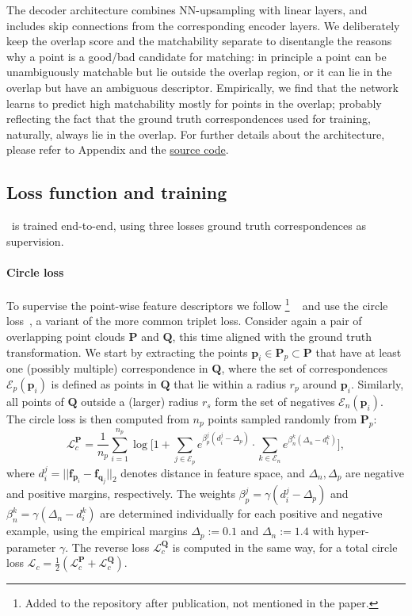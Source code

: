 The decoder architecture combines {NN}-upsampling with linear layers, and includes skip connections from the corresponding encoder layers.
We deliberately keep the overlap score and the matchability separate
to disentangle the reasons why a point is a good/bad candidate for matching: in principle a point can be unambiguously matchable but lie outside the overlap region, or it can lie in the overlap but have an ambiguous descriptor.
Empirically, we find that the network learns to predict high matchability mostly for points in the overlap; probably reflecting the fact that the ground truth correspondences used for training, naturally, always lie in the overlap.
For further details about the architecture, please refer to Appendix and the \href{https://github.com/ShengyuH/OverlapPredator}{source code}.

\subsection{Loss function and training}
\label{sec:method_training}
\acro\ is trained end-to-end, using three losses \wrt ground truth correspondences as supervision.

\paragraph{Circle loss}
To supervise the point-wise feature descriptors we follow%
\footnote{Added to the repository after publication, not mentioned in the paper.}%
~\cite{bai2020d3feat} and use the circle loss~\cite{sun2020circle}, a variant of the more common triplet loss.
Consider again a pair of overlapping point clouds $\mathbf{P}$ and $\mathbf{Q}$, this time aligned with the ground truth transformation. We start by extracting the points $\mathbf{p}_i\!\in\!\mathbf{P}_p\!\subset\!\mathbf{P}$ that have at least one (possibly multiple) correspondence in $\mathbf{Q}$,
where the set of correspondences $\mathcal{E}_p(\mathbf{p}_i)$  is defined as points in $\mathbf{Q}$ that lie within a radius $r_p$ around $\mathbf{p}_i$. Similarly, all points of $\mathbf{Q}$  outside a (larger) radius
$r_s$ form the set of negatives $\mathcal{E}_n(\mathbf{p}_i)$.
The circle loss is then computed from $n_p$ points sampled randomly from $\mathbf{P}_p$: %
\begin{equation}
\mathcal{L}_c^\mathbf{P} = \frac{1}{n_p}\sum\limits_{i=1}^{n_p} \log \Big [ 1 +\!\! \sum\limits_{j\in\mathcal{E}_p}\!e^{ \beta_p^j(d_i^j - \Delta_p)} \cdot\!
\sum\limits_{k\in\mathcal{E}_n} \!e^{\beta_n^k(\Delta_n - d_i^k)}\Big ],
\end{equation}
where $d_i^j=||\mathbf{f}_{\mathbf{p}_i} - \mathbf{f}_{\mathbf{q}_j} ||_2$ denotes distance in feature space, and $\Delta_n,\Delta_p$ are negative and positive margins, respectively. The weights $\beta_p^j\!=\!\gamma(d_i^j\!-\!\Delta_p)$ and $\beta_n^k\!=\!\gamma(\Delta_n\!-\!d_i^k)$ are determined individually for each positive and negative example, using the empirical margins $\Delta_p\!:=\!0.1$ and $\Delta_n\!:=\!1.4$ with hyper-parameter $\gamma$. The reverse loss  $\mathcal{L}_c^\mathbf{Q}$ is computed in the same way, for a total circle loss $\mathcal{L}_c = \frac{1}{2}(\mathcal{L}_c^\mathbf{P} + \mathcal{L}_c^\mathbf{Q})$.

